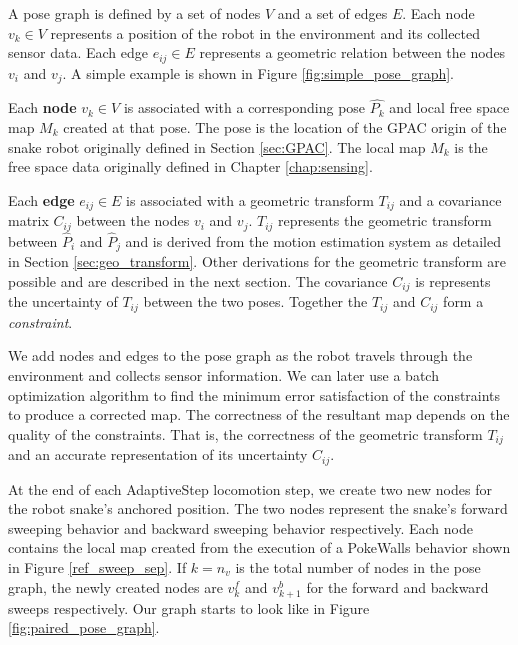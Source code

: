 A pose graph is defined by a set of nodes $V$ and a set of edges $E$.  Each node $v_k \in V$ represents a position of the robot in the environment and its collected sensor data.  Each edge $e_{ij} \in E$ represents a geometric relation between the nodes $v_i$ and $v_j$.  A simple example is shown in Figure \ref{fig:simple_pose_graph}.

Each \textbf{node} $v_k \in V$ is associated with a corresponding pose $\hat{P_k}$ and local free space map $M_k$ created at that pose.  The pose is the location of the GPAC origin of the snake robot originally defined in Section \ref{sec:GPAC}.  The local map $M_k$ is the free space data originally defined in Chapter \ref{chap:sensing}.

Each \textbf{edge} $e_{ij} \in E$ is associated with a geometric transform $T_{ij}$ and a covariance matrix $C_{ij}$ between the nodes $v_i$ and $v_j$.  $T_{ij}$ represents the geometric transform between $\hat{P}_i$ and $\hat{P}_j$ and is derived from the motion estimation system as detailed in Section \ref{sec:geo_transform}.  Other derivations for the geometric transform are possible and are described in the next section.  The covariance $C_{ij}$ is represents the uncertainty of $T_{ij}$ between the two poses.  Together the $T_{ij}$ and $C_{ij}$ form a \emph{constraint}.

We add nodes and edges to the pose graph as the robot travels through the environment and collects sensor information.  We can later use a batch optimization algorithm to find the minimum error satisfaction of the constraints to produce a corrected map.  The correctness of the resultant map depends on the quality of the constraints.  That is, the correctness of the geometric transform $T_{ij}$ and an accurate representation of its uncertainty $C_{ij}$.


At the end of each AdaptiveStep locomotion step, we create two new nodes for the robot snake's anchored position.  The two nodes represent the snake's forward sweeping behavior and backward sweeping behavior respectively.  Each node contains the local map created from the execution of a PokeWalls behavior shown in Figure \ref{ref_sweep_sep}.  If $k=n_v$ is the total number of nodes in the pose graph, the newly created nodes are $v^f_{k}$ and $v^b_{k+1}$ for the forward and backward sweeps respectively.  Our graph starts to look like in Figure \ref{fig:paired_pose_graph}.

